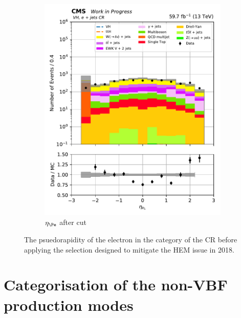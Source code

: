 \begin{figure}[htbp]
\begin{subfigure}[b]{0.34\textwidth}
        \includegraphics[width=\textwidth]{figures/hem_issue/region_3/leadLepton_eta_VH_after.pdf}
        \caption{$\eta_{\Pe}$ after cut}
    \end{subfigure}
    \caption[The psuedorapidity of the electron in the \VH category of the \singleEleCr \gls{CR} before applying the selection designed to mitigate the HEM issue in 2018]{The psuedorapidity of the electron in the \VH category of the \singleEleCr \gls{CR} before applying the selection designed to mitigate the HEM issue in 2018.}
    \label{fig:htoinv_hem_issue_lepton_eta}
\end{figure}





\section{Categorisation of the non-VBF production modes}
\label{sec:htoinv_categorisation}


